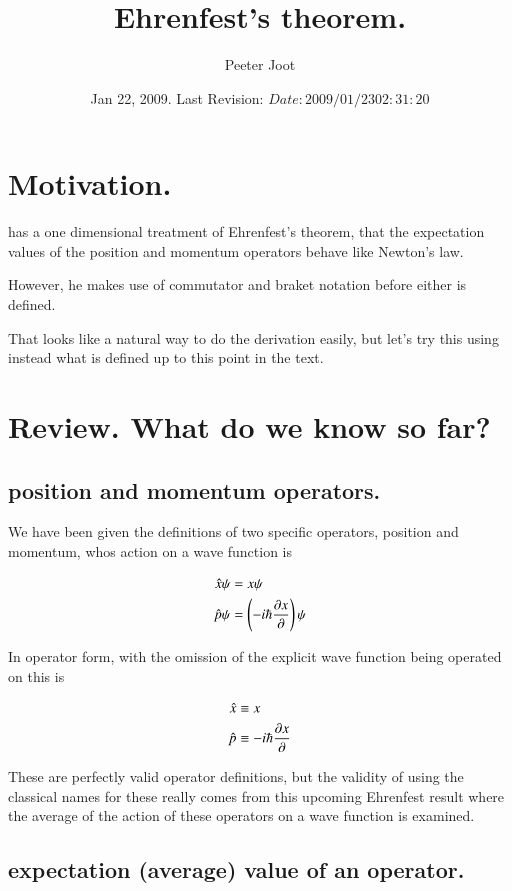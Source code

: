 \documentclass{article}
\title{ Ehrenfest's theorem. }
\author{Peeter Joot}
\date{ Jan 22, 2009.  Last Revision: $Date: 2009/01/23 02:31:20 $ }
\begin{document}
\maketitle{}

\section{ Motivation. }

\cite{mcmahon2005qmd} has a one dimensional treatment of Ehrenfest's theorem,
that the expectation values of the position and momentum operators behave
like Newton's law.

However, he makes use
of commutator and braket notation before either is defined.

That looks like a natural way to do the derivation easily, but let's try
this using instead what is defined up to this point in the text.

\section{ Review.  What do we know so far? }

\subsection{ position and momentum operators. }

We have been given the definitions of two specific operators, position and momentum, 
whos action on a wave function is

\begin{align*}
\hat{x} \psi &= x \psi \\
\hat{p} \psi &= \left(-i \hbar \frac{\partial{x}}{\partial {}}\right) \psi
\end{align*}

In operator form, with the omission of the explicit wave function being operated on this is

\begin{align*}
\hat{x} &\equiv x  \\
\hat{p} &\equiv -i \hbar \frac{\partial{x}}{\partial {}}
\end{align*}

These are perfectly valid operator definitions, but the validity of using the 
classical names for these really comes from this upcoming Ehrenfest result where
the average of the action of these operators on a wave function is examined.

\subsection{ expectation (average) value of an operator. }
\end{document}
